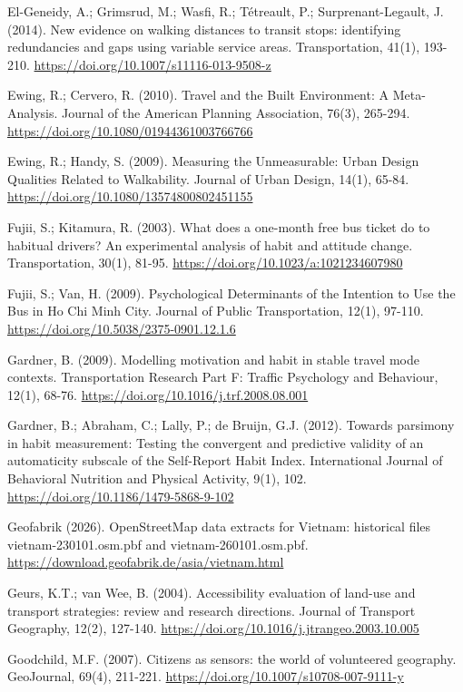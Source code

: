 \documentclass[
  11pt,
  a4paper,
]{article}
\begin{document}
El-Geneidy, A.; Grimsrud, M.; Wasfi, R.; Tétreault, P.;
Surprenant-Legault, J. (2014). New evidence on walking distances to
transit stops: identifying redundancies and gaps using variable service
areas. Transportation, 41(1), 193-210.
\url{https://doi.org/10.1007/s11116-013-9508-z}

Ewing, R.; Cervero, R. (2010). Travel and the Built Environment: A
Meta-Analysis. Journal of the American Planning Association, 76(3),
265-294. \url{https://doi.org/10.1080/01944361003766766}

Ewing, R.; Handy, S. (2009). Measuring the Unmeasurable: Urban Design
Qualities Related to Walkability. Journal of Urban Design, 14(1), 65-84.
\url{https://doi.org/10.1080/13574800802451155}

Fujii, S.; Kitamura, R. (2003). What does a one-month free bus ticket do
to habitual drivers? An experimental analysis of habit and attitude
change. Transportation, 30(1), 81-95.
\url{https://doi.org/10.1023/a:1021234607980}

Fujii, S.; Van, H. (2009). Psychological Determinants of the Intention
to Use the Bus in Ho Chi Minh City. Journal of Public Transportation,
12(1), 97-110. \url{https://doi.org/10.5038/2375-0901.12.1.6}

Gardner, B. (2009). Modelling motivation and habit in stable travel mode
contexts. Transportation Research Part F: Traffic Psychology and
Behaviour, 12(1), 68-76. \url{https://doi.org/10.1016/j.trf.2008.08.001}

Gardner, B.; Abraham, C.; Lally, P.; de Bruijn, G.J. (2012). Towards
parsimony in habit measurement: Testing the convergent and predictive
validity of an automaticity subscale of the Self-Report Habit Index.
International Journal of Behavioral Nutrition and Physical Activity,
9(1), 102. \url{https://doi.org/10.1186/1479-5868-9-102}

Geofabrik (2026). OpenStreetMap data extracts for Vietnam: historical
files vietnam-230101.osm.pbf and vietnam-260101.osm.pbf.
\url{https://download.geofabrik.de/asia/vietnam.html}

Geurs, K.T.; van Wee, B. (2004). Accessibility evaluation of land-use
and transport strategies: review and research directions. Journal of
Transport Geography, 12(2), 127-140.
\url{https://doi.org/10.1016/j.jtrangeo.2003.10.005}

Goodchild, M.F. (2007). Citizens as sensors: the world of volunteered
geography. GeoJournal, 69(4), 211-221.
\url{https://doi.org/10.1007/s10708-007-9111-y}
\end{document}
